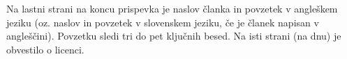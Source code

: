 \documentclass{article}
\begin{document}

\newpage
{}
\begin{abstracteng}
Na lastni strani na koncu prispevka je naslov članka in povzetek v angleškem jeziku (oz. naslov in povzetek v slovenskem jeziku, če je članek napisan v angleščini). Povzetku sledi tri do pet ključnih besed. Na isti strani (na dnu) je obvestilo o licenci.
\end{abstracteng}

\end{document}
